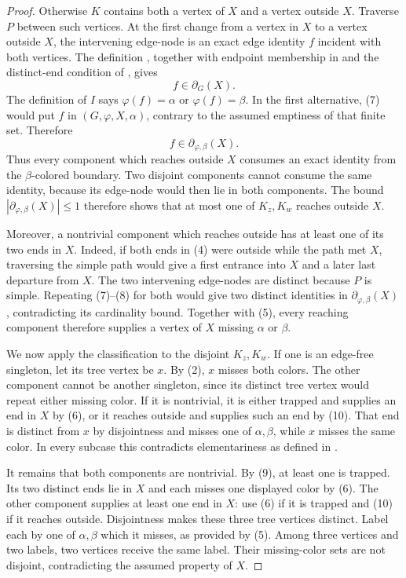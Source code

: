 \begin{proof}
Otherwise $K$ contains both a vertex of $X$ and a vertex outside $X$.
Traverse $P$ between such vertices.  At the first change from a vertex in
$X$ to a vertex outside $X$, the intervening edge-node is an exact edge
identity $f$ incident with both vertices.  The definition
, together with endpoint membership in
 and the distinct-end condition of
, gives
\[
                            f\in\partial_G(X).                \tag{7}
\]
The definition of $I$ says $\varphi(f)=\alpha$ or
$\varphi(f)=\beta$.  In the first alternative, (7) would put $f$ in
$(G,\varphi,X,\alpha)$, contrary to the
assumed emptiness of that finite set.  Therefore
\[
             f\in\partial_{\varphi,\beta}(X).                 \tag{8}
\]
Thus every component which reaches outside $X$ consumes an exact identity
from the $\beta$-colored boundary.  Two disjoint components cannot consume
the same identity, because its edge-node would then lie in both components.
The bound
$|\partial_{\varphi,\beta}(X)|\leq1$ therefore shows that at most one of
$K_z,K_w$ reaches outside $X$.                                

Moreover, a nontrivial component which reaches outside has at least one
of its two ends in $X$.  Indeed, if both ends in (4) were outside while
the path met $X$, traversing the simple path would give a first entrance
into $X$ and a later last departure from $X$.  The two intervening
edge-nodes are distinct because $P$ is simple.  Repeating (7)--(8) for
both would give two distinct identities in
$\partial_{\varphi,\beta}(X)$, contradicting its cardinality bound.
Together with (5), every reaching component therefore supplies a vertex
of $X$ missing $\alpha$ or $\beta$.                           

We now apply the classification to the disjoint $K_z,K_w$.  If one is an
edge-free singleton, let its tree vertex be $x$.  By (2), $x$ misses both
colors.  The other component cannot be another singleton, since its
distinct tree vertex would repeat either missing color.  If it is
nontrivial, it is either trapped and supplies an end in $X$ by (6), or it
reaches outside and supplies such an end by (10).  That end is distinct
from $x$ by disjointness and misses one of $\alpha,\beta$, while $x$
misses the same color.  In every subcase this contradicts elementariness
as defined in .

It remains that both components are nontrivial.  By (9), at least one is
trapped.  Its two distinct ends lie in $X$ and each misses one displayed
color by (6).  The other component supplies at least one end in $X$: use
(6) if it is trapped and (10) if it reaches outside.  Disjointness makes
these three tree vertices distinct.  Label each by one of
$\alpha,\beta$ which it misses, as provided by (5).  Among three vertices
and two labels, two vertices receive the same label.  Their missing-color
sets are not disjoint, contradicting the assumed
 property of $X$.


\end{proof}
